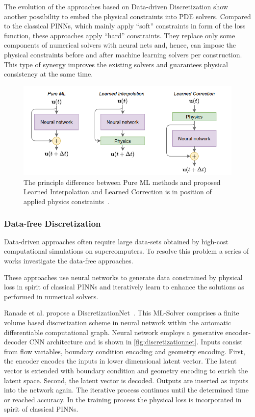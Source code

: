 The evolution of the approaches based on Data-driven Discretization show another possibility to embed the physical constraints into PDE solvers. Compared to the classical PINNs, which mainly apply ``soft'' constraints in form of the loss function, these approaches apply ``hard'' constraints. They replace only some components of numerical solvers with neural nets and, hence, can impose the physical constraints before and after machine learning solvers per construction. This type of synergy improves the existing solvers and guarantees physical consistency at the same time.

\begin{figure}
	\centering
	\includegraphics[width=12cm]{figures/lilc.png}
	\caption{The principle difference between Pure ML methods and proposed Learned Interpolation and  Learned Correction is in position of applied physics constraints~\cite{Brenner21}.}
	\label{fig:lilc}
\end{figure}  


\subsubsection{Data-free Discretization}

Data-driven approaches often require large data-sets obtained by high-cost computational simulations on supercomputers. To resolve this problem a series of works investigate the data-free approaches.

These approaches use neural networks to generate data constrained by physical loss in spirit of classical PINNs and iteratively learn to enhance the solutions as performed in numerical solvers.

Ranade et al. propose a DiscretizationNet~\cite{Ranade20}. This ML-Solver comprises a finite volume based discretization scheme in neural network within the automatic differentiable computational graph. Neural network employs a generative encoder-decoder CNN architecture and is shown in \cref{fig:discretizationnet}. Inputs consist from flow variables, boundary condition encoding and geometry encoding. First, the encoder encodes the inputs in lower dimensional latent vector. The latent vector is extended with boundary condition and geometry encoding to enrich the latent space. Second, the latent vector is decoded. Outputs are inserted as inputs into the network again. The iterative process continues until the determined time or reached accuracy. In the training process the physical loss is incorporated in spirit of classical PINNs.


